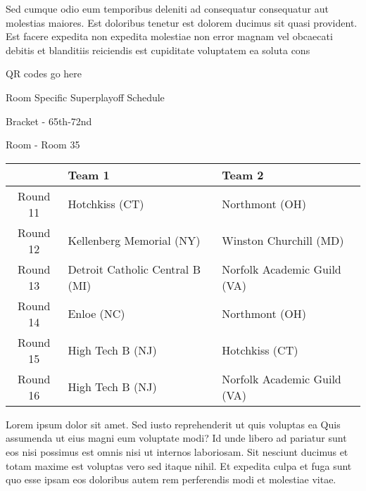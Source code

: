 \documentclass{article}%
\begin{document}
\newline%
    Sed cumque odio eum temporibus deleniti ad consequatur consequatur aut molestias maiores. Est doloribus tenetur est dolorem ducimus sit quasi provident. Est facere expedita non expedita molestiae non error magnam vel obcaecati debitis et blanditiis reiciendis est cupiditate voluptatem ea soluta cons%
\vspace*{140pt}%
\begin{center}%
\begin{Huge}%
QR codes go here%
\end{Huge}%
\end{center}%
\newpage%
\begin{center}%
\begin{Huge}%
Room Specific Superplayoff Schedule%
\end{Huge}%
\vspace*{8pt}%
\linebreak%
\begin{Large}%
Bracket {-} 65th{-}72nd%
\end{Large}%
\vspace*{8pt}%
\linebreak%
\vspace*{8pt}%
\begin{Large}%
Room {-} Room 35%
\end{Large}%
\end{center}%
%
\begin{tabularx}{\textwidth}{|c|Y|Y|}%
\hline%
&Team 1&Team 2\\%
\hline%
Round 11&Hotchkiss (CT)&Northmont (OH)\\%
Round 12&Kellenberg Memorial (NY)&Winston Churchill (MD)\\%
Round 13&Detroit Catholic Central B (MI)&Norfolk Academic Guild (VA)\\%
Round 14&Enloe (NC)&Northmont (OH)\\%
Round 15&High Tech B (NJ)&Hotchkiss (CT)\\%
Round 16&High Tech B (NJ)&Norfolk Academic Guild (VA)\\%
\hline%
\end{tabularx}%
\vspace*{8pt}%
\newline%
    Lorem ipsum dolor sit amet. Sed iusto reprehenderit ut quis voluptas ea Quis assumenda ut eius magni eum voluptate modi? Id unde libero ad pariatur sunt eos nisi possimus est omnis nisi ut internos laboriosam. Sit nesciunt ducimus et totam maxime est voluptas vero sed itaque nihil. Et expedita culpa et fuga sunt quo esse ipsam eos doloribus autem rem perferendis modi et molestiae vitae.\newline%
\end{document}
